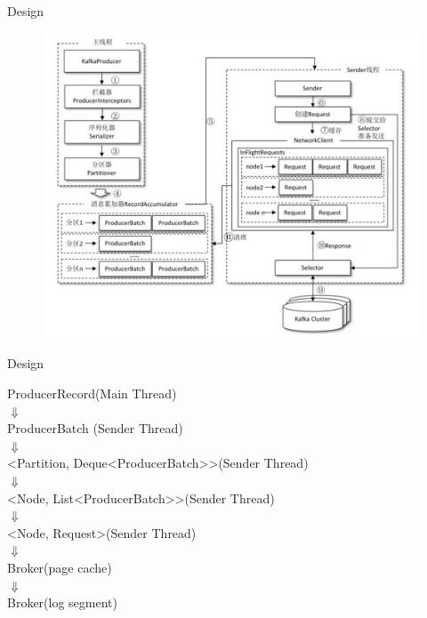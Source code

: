 \begin{frame}[plain,t]{Design} %
     \\
    \vspace{2ex}
    \begin{figure}
        \centering
        \includegraphics[width=0.7\linewidth]{image/0203}
        \label{fig:0203}
    \end{figure}
    
    
    
\end{frame}
\begin{frame}[plain,t]{Design} %
     \\
    \vspace{2ex}
    	\begin{center}
        ProducerRecord(Main Thread) \\
        $\Downarrow$ \\
        ProducerBatch (Sender Thread) \\
        $\Downarrow$ \\
        <Partition, Deque<ProducerBatch>{}>(Sender Thread) \\
        $\Downarrow$ \\
        <Node, List<ProducerBatch>{}>(Sender Thread) \\
        $\Downarrow$ \\
        <Node, Request>(Sender Thread) \\
        {\color{red}$\Downarrow$} \\
        Broker(page cache) \\
        $\Downarrow$ \\
        Broker(log segment)
    \end{center}
    
    
\end{frame}
